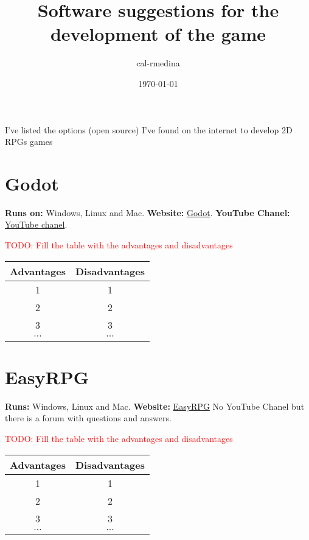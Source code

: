 \documentclass{article}
\title{Software suggestions for the development of the game}
\date{\today}
\author{cal-rmedina}
\begin{document}
  \maketitle

I've listed the options (open source) I've found on the internet to develop 2D RPGs games

\section{Godot}

\textbf{Runs on:} Windows, Linux and Mac.
\textbf{Website:} \href{https://godotengine.org/}{Godot}.
\textbf{YouTube Chanel:} \href{https://www.youtube.com/@GodotEngineOfficial/featured}{YouTube chanel}.

\textcolor{red}{TODO: Fill the table with the advantages and disadvantages} 

\begin{center}
\begin{tabular}{ |c|c| } 
  \hline
  Advantages & Disadvantages\\ 
  \hline
  1 & 1\\ 
  \hline
  2 & 2\\
  \hline
  3 & 3\\
  \hline
  $\cdots$ & $\cdots$\\
  \hline
\end{tabular}
\end{center}

\section{EasyRPG}

\textbf{Runs:} Windows, Linux and Mac.
\textbf{Website:} \href{https://easyrpg.org/}{EasyRPG}
No YouTube Chanel but there is a forum with questions and answers.

\textcolor{red}{TODO: Fill the table with the advantages and disadvantages} 

\begin{center}
\begin{tabular}{ |c|c| } 
  \hline
  Advantages & Disadvantages\\ 
  \hline
  1 & 1\\ 
  \hline
  2 & 2\\
  \hline
  3 & 3\\
  \hline
  $\cdots$ & $\cdots$\\
  \hline
\end{tabular}
\end{center}
\end{document}
